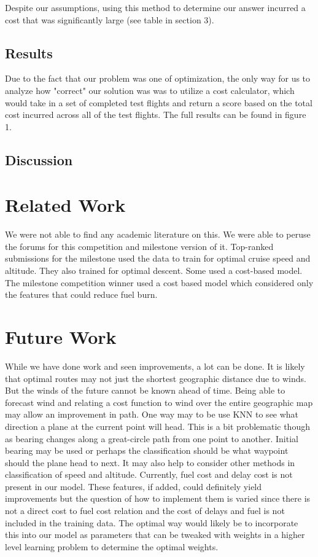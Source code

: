 \documentclass{article}[12pt]
\begin{document}
\begin{multicols}{2}
Despite our assumptions, using this method to determine our answer incurred a cost that was significantly large (see table in section 3).


\subsection{Results}
Due to the fact that our problem was one of optimization, the only way for us to analyze how "correct" our solution was was to utilize a cost calculator, which would take in a set of completed test flights and return a score based on the total cost incurred across all of the test flights. The full results can be found in figure 1. 
\subsection{Discussion}
\section{Related Work}
We were not able to find any academic literature on this. We were able to peruse the forums for this competition and milestone version of it. Top-ranked submissions for the milestone used the data to train for optimal cruise speed and altitude. They also trained for optimal descent. Some used a cost-based model. The milestone competition winner used a cost based model which considered only the features that could reduce fuel burn. 

\section{Future Work}
While we have done work and seen improvements, a lot can be done. It is likely that optimal routes may not just the shortest geographic distance due to winds. But the winds of the future cannot be known ahead of time. Being able to forecast wind and relating a cost function to wind over the entire geographic map may allow an improvement in path. One way may to be use KNN to see what direction a plane at the current point will head. This is a bit problematic though as bearing changes along a great-circle path from one point to another. Initial bearing may be used or perhaps the classification should be what waypoint should the plane head to next. It may also help to consider other methods in classification of speed and altitude. Currently, fuel cost and delay cost is not present in our model. These features, if added, could definitely yield improvements but the question of how to implement them is varied since there is not a direct cost to fuel cost relation and the cost of delays and fuel is not included in the training data. The optimal way would likely be to incorporate this into our model as parameters that can be tweaked with weights in a higher level learning problem to determine the optimal weights. \\


\end{multicols}
\end{document}
